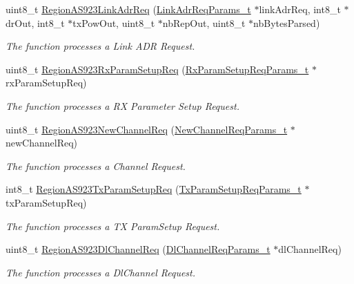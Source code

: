 \begin{DoxyCompactItemize}
uint8\+\_\+t \hyperlink{group__REGIONAS923_ga154ccc00c27ca878e07cfeab3716523a}{Region\+A\+S923\+Link\+Adr\+Req} (\hyperlink{group__REGION_gad4af503e8d4de1846129e26a799a1e8e}{Link\+Adr\+Req\+Params\+\_\+t} $\ast$link\+Adr\+Req, int8\+\_\+t $\ast$dr\+Out, int8\+\_\+t $\ast$tx\+Pow\+Out, uint8\+\_\+t $\ast$nb\+Rep\+Out, uint8\+\_\+t $\ast$nb\+Bytes\+Parsed)
\begin{DoxyCompactList}\small\item\em The function processes a Link A\+DR Request. \end{DoxyCompactList}\item 
uint8\+\_\+t \hyperlink{group__REGIONAS923_ga1cfa678c3c8157f7eb382d8fe9d9ba04}{Region\+A\+S923\+Rx\+Param\+Setup\+Req} (\hyperlink{group__REGION_ga7165f282c670c728c36d534df2285157}{Rx\+Param\+Setup\+Req\+Params\+\_\+t} $\ast$rx\+Param\+Setup\+Req)
\begin{DoxyCompactList}\small\item\em The function processes a RX Parameter Setup Request. \end{DoxyCompactList}\item 
uint8\+\_\+t \hyperlink{group__REGIONAS923_gaad10b4ed09a71cdff0e385729e4dc345}{Region\+A\+S923\+New\+Channel\+Req} (\hyperlink{group__REGION_gae2abcdb6dbb843c9faf5fd3009eca9d6}{New\+Channel\+Req\+Params\+\_\+t} $\ast$new\+Channel\+Req)
\begin{DoxyCompactList}\small\item\em The function processes a Channel Request. \end{DoxyCompactList}\item 
int8\+\_\+t \hyperlink{group__REGIONAS923_gab0fbb927f3521fd56696157e270043c1}{Region\+A\+S923\+Tx\+Param\+Setup\+Req} (\hyperlink{group__REGION_ga26836ef2996e70410e42ef471073f855}{Tx\+Param\+Setup\+Req\+Params\+\_\+t} $\ast$tx\+Param\+Setup\+Req)
\begin{DoxyCompactList}\small\item\em The function processes a TX Param\+Setup Request. \end{DoxyCompactList}\item 
uint8\+\_\+t \hyperlink{group__REGIONAS923_ga3517054139f97c1b45454355fe661f48}{Region\+A\+S923\+Dl\+Channel\+Req} (\hyperlink{group__REGION_gae0d608ff1f8ea0a430e4f9a4c38ec7f3}{Dl\+Channel\+Req\+Params\+\_\+t} $\ast$dl\+Channel\+Req)
\begin{DoxyCompactList}\small\item\em The function processes a Dl\+Channel Request. \end{DoxyCompactList}\item 

\end{DoxyCompactItemize}
